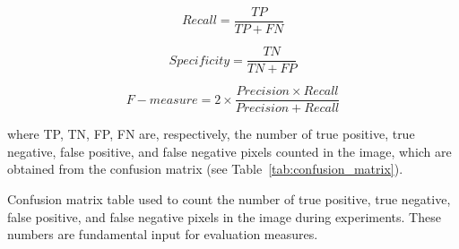 \begin{equation*}
    Recall = \frac{TP}{TP + FN}
    \label{eq:recall}
\end{equation*}

\begin{equation*}
    Specificity = \frac{TN}{TN + FP}
    \label{eq:specificity}
\end{equation*}

\begin{equation*}
    F-measure = 2 \times \frac{Precision \times Recall}{Precision + Recall}
    \label{eq:fmeasure}
\end{equation*}

where TP, TN, FP, FN are, respectively, the number of true positive, true negative, false positive, and false negative pixels counted in the image, which are obtained from the confusion matrix (see Table~\ref{tab:confusion_matrix}).

\begin{table}[H]
    \centering


    \caption[Confusion matrix table used during experiments]{Confusion matrix table used to count the number of true positive, true negative, false positive, and false negative pixels in the image during experiments. These numbers are fundamental input for evaluation measures.}
    \label{tab:confusion_matrix}
\end{table}




